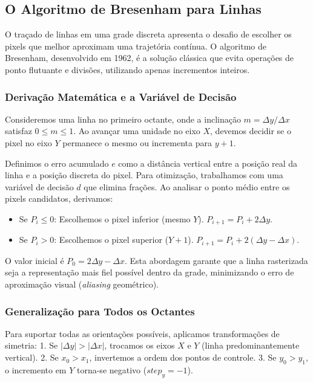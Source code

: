 \subsection{O Algoritmo de Bresenham para Linhas}

O traçado de linhas em uma grade discreta apresenta o desafio de escolher os pixels que melhor aproximam uma trajetória contínua. O algoritmo de Bresenham, desenvolvido em 1962, é a solução clássica que evita operações de ponto flutuante e divisões, utilizando apenas incrementos inteiros.

\subsubsection{Derivação Matemática e a Variável de Decisão}

Consideremos uma linha no primeiro octante, onde a inclinação $m = \Delta y / \Delta x$ satisfaz $0 \le m \le 1$. Ao avançar uma unidade no eixo $X$, devemos decidir se o pixel no eixo $Y$ permanece o mesmo ou incrementa para $y+1$.

Definimos o erro acumulado $e$ como a distância vertical entre a posição real da linha e a posição discreta do pixel. Para otimização, trabalhamos com uma variável de decisão $d$ que elimina frações. Ao analisar o ponto médio entre os pixels candidatos, derivamos:
\begin{itemize}
    \item Se $P_i \le 0$: Escolhemos o pixel inferior (mesmo $Y$). $P_{i+1} = P_i + 2\Delta y$.
    \item Se $P_i > 0$: Escolhemos o pixel superior ($Y+1$). $P_{i+1} = P_i + 2(\Delta y - \Delta x)$.
\end{itemize}

O valor inicial é $P_0 = 2\Delta y - \Delta x$. Esta abordagem garante que a linha rasterizada seja a representação mais fiel possível dentro da grade, minimizando o erro de aproximação visual (\textit{aliasing} geométrico).

\subsubsection{Generalização para Todos os Octantes}

Para suportar todas as orientações possíveis, aplicamos transformações de simetria:
1. Se $|\Delta y| > |\Delta x|$, trocamos os eixos $X$ e $Y$ (linha predominantemente vertical).
2. Se $x_0 > x_1$, invertemos a ordem dos pontos de controle.
3. Se $y_0 > y_1$, o incremento em $Y$ torna-se negativo ($step_y = -1$).


